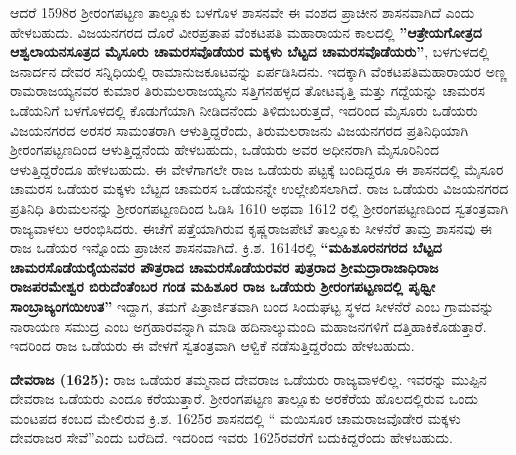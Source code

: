 \newpage

ಆದರೆ 1598ರ ಶ‍್ರೀರಂಗಪಟ್ಟಣ ತಾಲ್ಲೂಕು ಬಳಗೊಳ ಶಾಸನವೇ ಈ ವಂಶದ ಪ್ರಾಚೀನ ಶಾಸನವಾಗಿದೆ ಎಂದು ಹೇಳಬಹುದು. ವಿಜಯನಗರದ ದೊರೆ ವೀರಪ್ರತಾಪ ವೆಂಕಟಪತಿ ಮಹಾರಾಯನ ಕಾಲದಲ್ಲಿ \textbf{''ಆತ್ರೇಯಗೋತ್ರದ ಆಶ್ವಲಾಯನ\-ಸೂತ್ರದ ಮೈಸೂರು ಚಾಮರಸವೊಡೆಯರ ಮಕ್ಕಳು ಬೆಟ್ಟದ ಚಾಮರಸವೊಡೆಯರು''}, ಬಳಗುಳದಲ್ಲಿ ಜನಾರ್ದನ ದೇವರ ಸನ್ನಿಧಿಯಲ್ಲಿ ರಾಮಾನುಜಕೂಟವನ್ನು ಏರ್ಪಡಿಸಿದನು. ಇದಕ್ಕಾಗಿ ವೆಂಕಟಪತಿಮಹಾರಾಯರ ಅಣ್ಣ ರಾಮರಾಜಯ್ಯನವರ ಕುಮಾರ ತಿರುಮಲರಾಜಯ್ಯನು ಸತ್ತಿಗನಹಳ್ಳದ ತೋಟವೃತ್ತಿ ಮತ್ತು ಗದ್ದೆಯನ್ನು ಚಾಮರಸ ಒಡೆಯನಿಗೆ ಬಳಗೊಳದಲ್ಲಿ ಕೊಡುಗೆಯಾಗಿ ನೀಡಿದನೆಂದು ತಿಳಿದುಬರುತ್ತದೆ, ಇದರಿಂದ ಮೈಸೂರು ಒಡೆಯರು ವಿಜಯನಗರದ ಅರಸರ ಸಾಮಂತರಾಗಿ ಆಳುತ್ತಿದ್ದರೆಂದು, ತಿರುಮಲರಾಜನು ವಿಜಯನಗರದ ಪ್ರತಿನಿಧಿಯಾಗಿ ಶ‍್ರೀರಂಗಪಟ್ಟಣದಿಂದ ಆಳುತ್ತಿದ್ದನೆಂದು ಹೇಳಬಹುದು, ಒಡೆಯರು ಅವರ ಅಧೀನರಾಗಿ ಮೈಸೂರಿನಿಂದ ಆಳುತ್ತಿದ್ದರೆಂದೂ ಹೇಳಬಹುದು. ಈ ವೇಳೆಗಾಗಲೇ ರಾಜ ಒಡೆಯರು ಪಟ್ಟಕ್ಕೆ ಬಂದಿದ್ದರೂ ಈ ಶಾಸನದಲ್ಲಿ ಮೈಸೂರ ಚಾಮರಸ ಒಡೆಯರ ಮಕ್ಕಳು ಬೆಟ್ಟದ ಚಾಮರಸ ಒಡೆಯನನ್ನೇ ಉಲ್ಲೇಖಿಸಲಾಗಿದೆ. ರಾಜ ಒಡೆಯರು ವಿಜಯನಗರದ ಪ್ರತಿನಿಧಿ ತಿರುಮಲನನ್ನು ಶ‍್ರೀರಂಗಪಟ್ಟಣದಿಂದ ಓಡಿಸಿ 1610 ಅಥವಾ 1612 ರಲ್ಲಿ ಶ‍್ರೀರಂಗಪಟ್ಟಣದಿಂದ ಸ್ವತಂತ್ರವಾಗಿ ರಾಜ್ಯವಾಳಲು ಆರಂಭಿಸಿದರು. ಈಚೆಗೆ ಪತ್ತೆಯಾಗಿರುವ ಕೃಷ್ಣರಾಜಪೇಟೆ ತಾಲ್ಲೂಕು ಸೀಳನೆರೆ ತಾಮ್ರ ಶಾಸನವು ಈ ರಾಜ ಒಡೆಯರ ಇನ್ನೊಂದು ಪ್ರಾಚೀನ ಶಾಸನವಾಗಿದೆ. ಕ್ರಿ.ಶ. 1614ರಲ್ಲಿ \textbf{“ಮಹಿಶೂರನಗರದ ಬೆಟ್ಟದ ಚಾಮರಸೊಡೆಯರೈಯನವರ ಪೌತ್ರರಾದ ಚಾಮರಸೊಡೆಯರವರ ಪುತ್ರರಾದ ಶ‍್ರೀಮದ್ರಾರಾಜಾಧಿರಾಜ ರಾಜಪರಮೇಶ್ವರ ಬಿರುದೆಂತೆಂಬರ ಗಂಡ ಮಹಿಶೂರ ರಾಜ ಒಡೆಯರು ಶ‍್ರೀರಂಗಪಟ್ಟಣದಲ್ಲಿ ಪೃಥ್ವೀ ಸಾಂಬ್ರಾಜ್ಯಂಗಯಿಉತ”} ಇದ್ದಾಗ, ತಮಗೆ ಪಿತ್ರಾರ್ಜಿತವಾಗಿ ಬಂದ ಸಿಂದುಘಟ್ಟ ಸ್ಥಳದ ಸೀಳನೆರೆ ಎಂಬ ಗ್ರಾಮವನ್ನು ನಾರಾಯಣ ಸಮುದ್ರ ಎಂಬ ಅಗ್ರಹಾರವನ್ನಾಗಿ ಮಾಡಿ ಹದಿನಾಲ್ಕುಮಂದಿ ಮಹಾಜನಗಳಿಗೆ ದತ್ತಿಹಾಕಿಕೊಡುತ್ತಾರೆ. ಇದರಿಂದ ರಾಜ ಒಡೆಯರು ಈ ವೇಳಗೆ ಸ್ವತಂತ್ರವಾಗಿ ಆಳ್ವಿಕೆ ನಡೆಸುತ್ತಿದ್ದರೆಂದು ಹೇಳಬಹುದು. 

\textbf{ದೇವರಾಜ (1625): } ರಾಜ ಒಡೆಯರ ತಮ್ಮನಾದ ದೇವರಾಜ ಒಡೆಯರು ರಾಜ್ಯವಾಳಲಿಲ್ಲ. ಇವರನ್ನು ಮುಪ್ಪಿನ ದೇವರಾಜ ಒಡೆಯರು ಎಂದೂ ಕರೆಯುತ್ತಾರೆ. ಶ‍್ರೀರಂಗಪಟ್ಟಣ ತಾಲ್ಲೂಕು ಅರಕೆರೆಯ ಹೊಲದಲ್ಲಿರುವ ಒಂದು ಮಂಟಪದ ಕಂಬದ ಮೇಲಿರುವ ಕ್ರಿ.ಶ. 1625ರ ಶಾಸನದಲ್ಲಿ “ ಮಯಿಸೂರ ಚಾಮರಾಜವೊಡೇರ ಮಕ್ಕಳು ದೇವರಾಜರ ಸೇವೆ”ಎಂದು ಬರೆದಿದೆ. ಇದರಿಂದ ಇವರು 1625ರವರೆಗೆ ಬದುಕಿದ್ದರೆಂದು ಹೇಳಬಹುದು.

